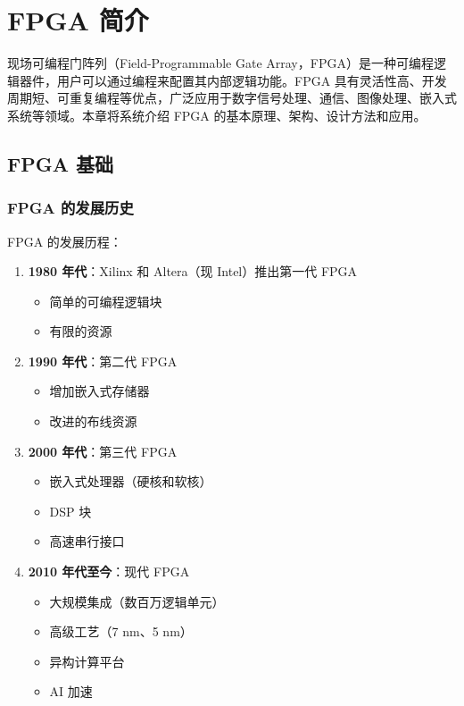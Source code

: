\chapter{FPGA 简介}

现场可编程门阵列（Field-Programmable Gate Array，FPGA）是一种可编程逻辑器件，用户可以通过编程来配置其内部逻辑功能。FPGA 具有灵活性高、开发周期短、可重复编程等优点，广泛应用于数字信号处理、通信、图像处理、嵌入式系统等领域。本章将系统介绍 FPGA 的基本原理、架构、设计方法和应用。

\section{FPGA 基础}

\subsection{FPGA 的发展历史}

FPGA 的发展历程：

\begin{enumerate}
  \item \textbf{1980 年代}：Xilinx 和 Altera（现 Intel）推出第一代 FPGA
    \begin{itemize}
      \item 简单的可编程逻辑块
      \item 有限的资源
    \end{itemize}

  \item \textbf{1990 年代}：第二代 FPGA
    \begin{itemize}
      \item 增加嵌入式存储器
      \item 改进的布线资源
    \end{itemize}

  \item \textbf{2000 年代}：第三代 FPGA
    \begin{itemize}
      \item 嵌入式处理器（硬核和软核）
      \item DSP 块
      \item 高速串行接口
    \end{itemize}

  \item \textbf{2010 年代至今}：现代 FPGA
    \begin{itemize}
      \item 大规模集成（数百万逻辑单元）
      \item 高级工艺（7 nm、5 nm）
      \item 异构计算平台
      \item AI 加速
    \end{itemize}
\end{enumerate}

